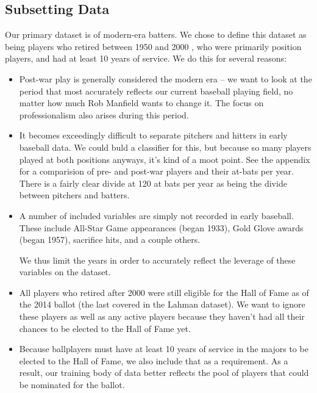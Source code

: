 \documentclass[letterpaper, 10 pt, conference]{ieeeconf}
\begin{document}
\subsection{Subsetting Data}
Our primary dataset is of modern-era batters. We chose to define this dataset as being players who retired between 1950 and 2000 , who were primarily position players, and had at least 10 years of service. We do this for several reasons:
\begin{itemize}
\item Post-war play is generally considered the modern era – we want to look at the period that most accurately reflects our current baseball playing field, no matter how much Rob Manfield wants to change it. The focus on professionalism also arises during this period.
\item It becomes exceedingly difficult to separate pitchers and hitters in early baseball data. We could buld a classifier for this, but because so many players played at both positions anyways, it’s kind of a moot point. See the appendix for a comparision of pre- and post-war players and their at-bats per year. There is a fairly clear divide at 120 at bats per year as being the divide between pitchers and batters. 
\item A number of included variables are simply not recorded in early baseball. These include All-Star Game appearances (began 1933), Gold Glove awards (began 1957), sacrifice hits, and a couple others. 

We thus limit the years in order to accurately reflect the leverage of these variables on the dataset.
\item All players who retired after 2000 were still eligible for the Hall of Fame as of the 2014 ballot (the last covered in the Lahman dataset). We want to ignore these players as well as any active players because they haven’t had all their chances to be elected to the Hall of Fame yet. 

\item Because ballplayers must have at least 10 years of service in the majors to be elected to the Hall of Fame, we also include that as a requirement. As a result, our training body of data better reflects the pool of players that could be nominated for the ballot.


\end{itemize}
\end{document}
